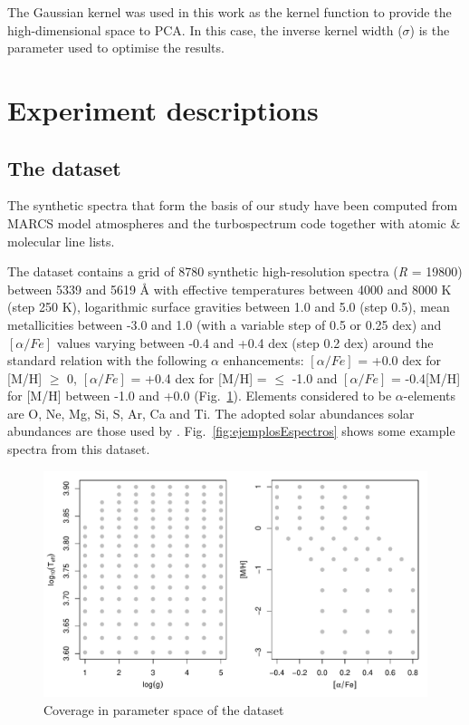 \documentclass[a4paper,fleqn,usenatbib]{mnras}
\begin{document}
The Gaussian kernel was used in this work as the kernel function 
to provide the high-dimensional space to PCA. In this case, the 
inverse kernel width ($\sigma$) is the parameter used to optimise 
the results. 
 

\section{Experiment descriptions}
\label{sec:experiment}
\subsection{The dataset}

The synthetic spectra that form the basis of our study have been
computed from MARCS model atmospheres \citep{gustafsson:08} and the
turbospectrum code \citep{alvarez:98, plez:12} together with atomic \&
molecular line lists.

The dataset contains a grid of 8780 synthetic high-resolution spectra
(\textit{R} = 19800) between 5339 and 5619 {\AA}
with effective temperatures between 4000 and 8000 K (step 250 K),
logarithmic surface gravities between 1.0 and 5.0 (step 0.5), mean
metallicities between -3.0 and 1.0 (with a variable step of 0.5 or
0.25 dex) and $\left[ \alpha/Fe \right]$ values varying between -0.4
and +0.4 dex (step 0.2 dex) around the standard relation with the
following $\alpha$ enhancements: $\left[ \alpha/Fe \right]$ = +0.0 dex
for [M/H] $\geqslant$ 0, $\left[ \alpha/Fe \right]$ = +0.4 dex for
[M/H] = $\leqslant$ -1.0 and $\left[ \alpha/Fe \right]$ = -0.4[M/H]
for [M/H] between -1.0 and +0.0 (Fig.~\ref{fig:gridModelos}).  
Elements considered to be $\alpha$-elements are O, Ne, Mg, Si, S, 
Ar, Ca and Ti. The adopted solar abundances solar abundances are those 
used by \citep{gustafsson:08}.
Fig.~\ref{fig:ejemplosEspectros} shows some example spectra 
from this dataset.

\begin{figure}
\centering\includegraphics[width=\columnwidth]{grid_modelos.pdf}
\caption{Coverage in parameter space of the dataset}
\label{fig:gridModelos}
\end{figure}
\end{document}
